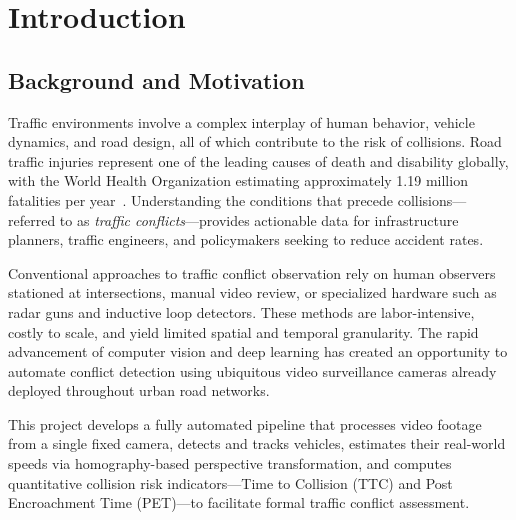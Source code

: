 \documentclass[12pt]{report}
\begin{document}
\clearpage

\tableofcontents
\clearpage

\listoffigures
\clearpage

\listoftables
\clearpage


\chapter{Introduction}

\section{Background and Motivation}

Traffic environments involve a complex interplay of human behavior, vehicle dynamics, and road design, all of which contribute to the risk of collisions.
Road traffic injuries represent one of the leading causes of death and disability globally, with the World Health Organization estimating approximately 1.19 million fatalities per year~\cite{WHO2023}.
Understanding the conditions that precede collisions---referred to as \emph{traffic conflicts}---provides actionable data for infrastructure planners, traffic engineers, and policymakers seeking to reduce accident rates.

Conventional approaches to traffic conflict observation rely on human observers stationed at intersections, manual video review, or specialized hardware such as radar guns and inductive loop detectors.
These methods are labor-intensive, costly to scale, and yield limited spatial and temporal granularity.
The rapid advancement of computer vision and deep learning has created an opportunity to automate conflict detection using ubiquitous video surveillance cameras already deployed throughout urban road networks.

This project develops a fully automated pipeline that processes video footage from a single fixed camera, detects and tracks vehicles, estimates their real-world speeds via homography-based perspective transformation, and computes quantitative collision risk indicators---Time to Collision (TTC) and Post Encroachment Time (PET)---to facilitate formal traffic conflict assessment.
\end{document}
